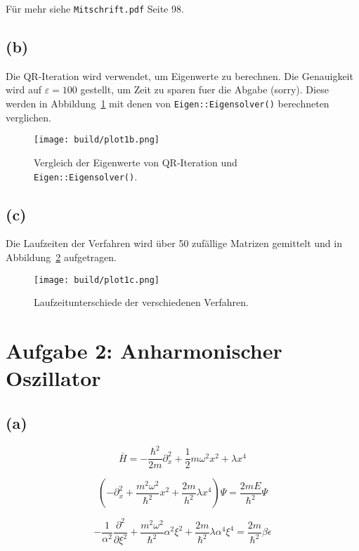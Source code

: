 \documentclass{scrartcl}
\begin{document}
Für mehr siehe \texttt{Mitschrift.pdf} Seite 98.


\subsection*{(b)}
Die QR-Iteration wird verwendet, um Eigenwerte zu berechnen.
Die Genauigkeit wird auf $\varepsilon = 100$ gestellt, um Zeit zu sparen fuer die Abgabe (sorry).
Diese werden in Abbildung~\ref{fig:1b} mit denen von \texttt{Eigen::Eigensolver()} berechneten verglichen.
\begin{figure}[ht]
		\centering
		\texttt{[image: build/plot1b.png]}
		\caption{Vergleich der Eigenwerte von QR-Iteration und \texttt{Eigen::Eigensolver()}.}%
		\label{fig:1b}
\end{figure}

\subsection*{(c)}
Die Laufzeiten der Verfahren wird über 50 zufällige Matrizen gemittelt und in Abbildung~\ref{fig:1c} aufgetragen.
\begin{figure}[ht]
		\centering
		\texttt{[image: build/plot1c.png]}
		\caption{Laufzeitunterschiede der verschiedenen Verfahren.}%
		\label{fig:1c}
\end{figure}

\section*{Aufgabe 2: Anharmonischer Oszillator}
\subsection*{(a)}

\begin{equation}
		\bar{H} = - \frac{\hbar^2}{2m} \partial^2_x + \frac{1}{2} m \omega^2 x^2
		+ \lambda x^4
\end{equation}

\begin{equation}
		\left( - \partial_x^2 + \frac{m^2 \omega^2}{\hbar^2} x^2 + \frac{2m}{h^2}
		\lambda x^4 \right) \Psi = \frac{2 m  E}{\hbar^2} \Psi
\end{equation}

\begin{equation}
		- \frac{1}{\alpha^2} \frac{\partial^2}{\partial \xi^2} + \frac{m^2
		\omega^2}{\hbar^2} \alpha^2 \xi^2 + \frac{2m}{\hbar^2} \lambda \alpha^4
		\xi^4 = \frac{2m}{\hbar^2} \beta \epsilon
\end{equation}
\end{document}
